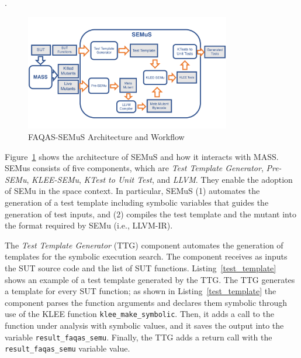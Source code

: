 .

\begin{figure}[tb]
\begin{center}
\includegraphics[width=0.8\textwidth]{images/semus-architecture}
\caption{FAQAS-SEMuS Architecture and Workflow}
\label{fig:semus_architecture}
\end{center}
\end{figure}



Figure~\ref{fig:semus_architecture} shows the architecture of SEMuS and how it interacts with MASS. SEMus consists of five components, which are \emph{Test Template Generator},  \emph{Pre-SEMu},  \emph{KLEE-SEMu},  \emph{KTest to Unit Test}, and \emph{LLVM}.
They enable the adoption of SEMu in the space context. In particular, SEMuS (1) automates the generation of a test template including symbolic variables that guides the generation of test inputs, and (2) compiles the test template and the mutant into the format required by SEMu (i.e., LLVM-IR). 


The \emph{Test Template Generator} (TTG) component automates the generation of templates for the symbolic execution search. The component receives as inputs the SUT source code and the list of SUT functions. 
Listing~\ref{test_template} shows an example of a test template generated by the TTG. The TTG generates a template for every SUT function; as shown in Listing~\ref{test_template} the component parses the function arguments and declares them symbolic through use of the KLEE function \texttt{klee\_make\_symbolic}. Then, it adds a call to the function under analysis with symbolic values, and it saves the output into the variable \texttt{result\_faqas\_semu}. Finally, the TTG adds a return call with the \texttt{result\_faqas\_semu} variable value.

